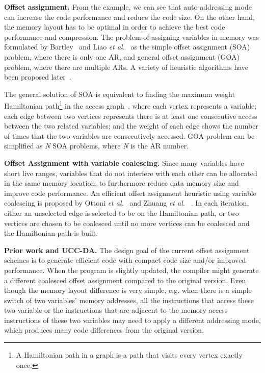 \textbf{Offset assignment.}
From the example, we can see that auto-addressing mode can increase the code performance and reduce the code size. On 
the other hand, the memory layout has to be optimal in order to achieve the best code performance and compression. The 
problem of assigning variables in memory was formulated by Bartley~\cite{related:bartley} and Liao \textit{et 
al.}~\cite{related:liao} as the simple offset assignment (SOA) problem, where there is only one AR, and general offset 
assignment (GOA) problem, where there are multiple ARs. A variety of heuristic algorithms have been proposed 
later~\cite{related:atri,related:choi,related:leupers-1996,related:leupers-1998,related:ottoni,related:rao,
related:sudarsanam,related:zhuang,zhuangtoplas}.

The general solution of SOA is equivalent to finding the maximum weight Hamiltonian path\footnote{A Hamiltonian path in 
a graph is a path that visits every vertex exactly once.} in the access graph~\cite{related:bartley, related:liao}, 
where each vertex represents a variable; each edge between two vertices represents there is at least one consecutive 
access between the two related variables; and the weight of each edge shows the number of times that the two variables 
are consecutively accessed. GOA problem can be simplified as \textit{N} SOA problems, where \textit{N} is the AR 
number. 

\textbf{Offset Assignment with variable coalescing.}
Since many variables have short live ranges, variables that do not interfere with each other can be allocated in the 
same memory location, to furthermore reduce data memory size and improve code performance. An efficient offset 
assignment heuristic using variable coalescing is proposed by Ottoni \textit{et al.}~\cite{related:ottoni} and Zhuang 
\textit{et al.} ~\cite{related:zhuang, zhuangtoplas}. In each iteration, either an unselected edge is selected to be on the 
Hamiltonian path, or two vertices are chosen to be coalesced until no more vertices can be coalesced and the 
Hamiltonian path is built.

\textbf{Prior work and UCC-DA.}
The design goal of the current offset assignment schemes is to generate efficient code with compact code size and/or 
improved performance.  When the program is slightly updated, the compiler might generate a different coalesced offset 
assignment compared to the original version. Even though the memory layout difference is very simple, e.g. when there 
is a simple switch of two variables' memory addresses, all the instructions that access these two variable or the 
instructions that are adjacent to the memory access instructions of these two variables may need to apply a different 
addressing mode, which produces many code differences from the original version. 


